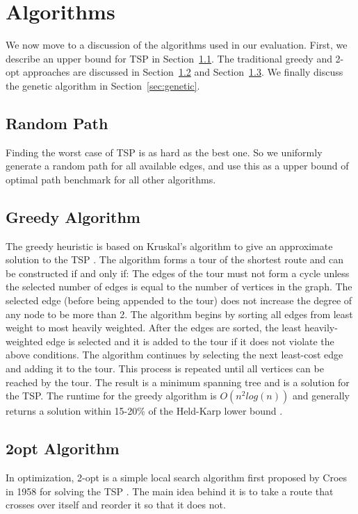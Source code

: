 \documentclass[10pt,twocolumn,letterpaper]{article}
\begin{document}
\section{Algorithms}\label{sec:algo}
We now move to a discussion of the algorithms used in our evaluation. 
First, we describe an upper bound for TSP in Section~\ref{sec:rand}.
The traditional greedy and 2-opt approaches are discussed in Section~\ref{sec:greedy} and Section~\ref{sec:2opt}. 
We finally discuss the genetic algorithm in Section~\ref{sec:genetic}.

\subsection{Random Path}\label{sec:rand}
Finding the worst case of TSP is as hard as the best one.
So we uniformly generate a random path for all available edges, 
and use this as a upper bound of optimal path benchmark for all other algorithms.

\subsection{Greedy Algorithm}\label{sec:greedy}
The greedy heuristic is based on Kruskal’s algorithm to
give an approximate solution to the TSP \cite{kim1998comparison}. The algorithm
forms a tour of the shortest route and can be constructed if and only if:
The edges of the tour must not form a cycle unless
the selected number of edges is equal to the number of
vertices in the graph.
The selected edge (before being appended to the tour)
does not increase the degree of any node to be more
than 2.
The algorithm begins by sorting all edges from least weight
to most heavily weighted. After the edges are sorted, the
least heavily-weighted edge is selected and it is added to the tour if it does not violate the above conditions. The algorithm continues by selecting the next least-cost edge and adding it to the tour. This process is repeated until all vertices can be reached by the tour. The result is a minimum
spanning tree and is a solution for the TSP. The runtime for
the greedy algorithm is $O(n^2log(n))$ and generally returns a solution within 15-20\% of the Held-Karp lower bound \cite{rosenkrantz1977analysis}.

\subsection{2opt Algorithm}\label{sec:2opt}
In optimization, 2-opt is a simple local search algorithm first proposed by Croes in 1958 for solving the TSP \cite{croes1958method}.
The main idea behind it is to take a route that crosses over itself and reorder it so that it does not.
\end{document}
